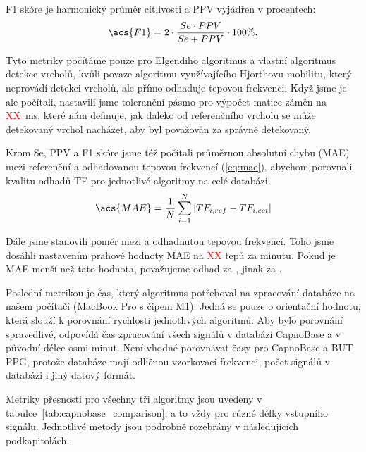 \acs{F1} skóre je harmonický průměr citlivosti a \acs{PPV} vyjádřen v procentech:
\begin{equation}
	\label{eq:f1}
	\acs{F1} = 2 \cdot \frac{Se \cdot PPV}{Se + PPV} \cdot 100\%.
\end{equation}

Tyto metriky počítáme pouze pro Elgendiho algoritmus a vlastní algoritmus detekce vrcholů, kvůli povaze algoritmu využívajícího Hjorthovu mobilitu, který neprovádí detekci vrcholů, ale přímo odhaduje tepovou frekvenci.
Když jsme je ale počítali, nastavili jsme toleranční pásmo pro výpočet matice záměn na \textcolor{red}{XX}~ms, které nám definuje, jak daleko od referenčního vrcholu se může detekovaný vrchol nacházet, aby byl považován za správně detekovaný.

Krom \acs{Se}, \acs{PPV} a \acs{F1} skóre jsme též počítali průměrnou absolutní chybu (\acs{MAE}) mezi referenční a odhadovanou tepovou frekvencí (\ref{eq:mae}), abychom porovnali kvalitu odhadů \acs{TF} pro jednotlivé algoritmy na celé databázi.
\begin{equation}
	\label{eq:mae}
	\acs{MAE} = \frac{1}{N} \sum_{i=1}^{N} |TF_{i,ref} - TF_{i,est}|
\end{equation}

Dále jsme stanovili poměr mezi  a  odhadnutou tepovou frekvencí.
Toho jsme dosáhli nastavením prahové hodnoty \acs{MAE} na \textcolor{red}{XX} tepů za minutu.
Pokud je \acs{MAE} menší než tato hodnota, považujeme odhad za , jinak za .

Poslední metrikou je čas, který algoritmus potřeboval na zpracování databáze na našem počítači (MacBook Pro s čipem M1).
Jedná se pouze o orientační hodnotu, která slouží k porovnání rychlosti jednotlivých algoritmů.
Aby bylo porovnání spravedlivé, odpovídá čas zpracování všech signálů v databázi CapnoBase a v původní délce osmi minut.
Není vhodné porovnávat časy pro CapnoBase a \acs{BUT PPG}, protože databáze mají odličnou vzorkovací frekvenci, počet signálů v databázi i jiný datový formát.

Metriky přesnosti pro všechny tři algoritmy jsou uvedeny v tabulce~\ref{tab:capnobase_comparison}, a to vždy pro různé délky vstupního signálu.
Jednotlivé metody jsou podrobně rozebrány v následujících podkapitolách.

